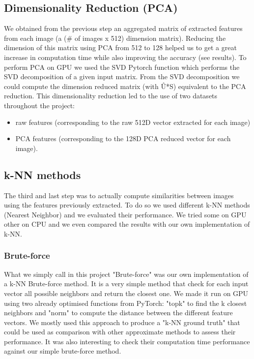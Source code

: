 \documentclass[a4paper]{article}
\begin{document}
\subsection{Dimensionality Reduction (PCA)}

We obtained from the previous step an aggregated matrix of extracted features from each image (a  (\# of images x 512) dimension matrix). Reducing the dimension of this matrix using PCA  from 512 to 128 helped us to get a great increase in computation time while also improving the accuracy (see results). To perform PCA on GPU we used the SVD Pytorch function which performs the SVD decomposition of a given input matrix. From the SVD decomposition we could compute the dimension reduced matrix (with Û*S) equivalent to the PCA reduction. This dimensionality reduction led to the use of two datasets throughout the project: 
\begin{itemize}  
	\item raw features (corresponding to the raw 512D vector extracted for each image)  
	\item PCA features (corresponding to the 128D PCA reduced vector for each image).
\end{itemize}

\subsection{k-NN methods}

The third and last step was to actually compute similarities between images using the features previously extracted. To do so we used different k-NN methods (Nearest Neighbor) and we evaluated their performance. We tried some on GPU other on CPU and we even compared the results with our own implementation of k-NN.

\subsubsection{Brute-force}

What we simply call in this project "Brute-force" was our own implementation of a k-NN Brute-force method. It is a very simple method that check for each input vector all possible neighbors and return the closest one. We made it run on GPU using two already optimised functions from PyTorch: "topk" to find the k closest neighbors and "norm" to compute the distance between the different feature vectors. We mostly used this approach to produce a "k-NN ground truth" that could be used as comparison with other approximate methods to assess their performance. It was also interesting to check their computation time performance against our simple brute-force method.
\end{document}
